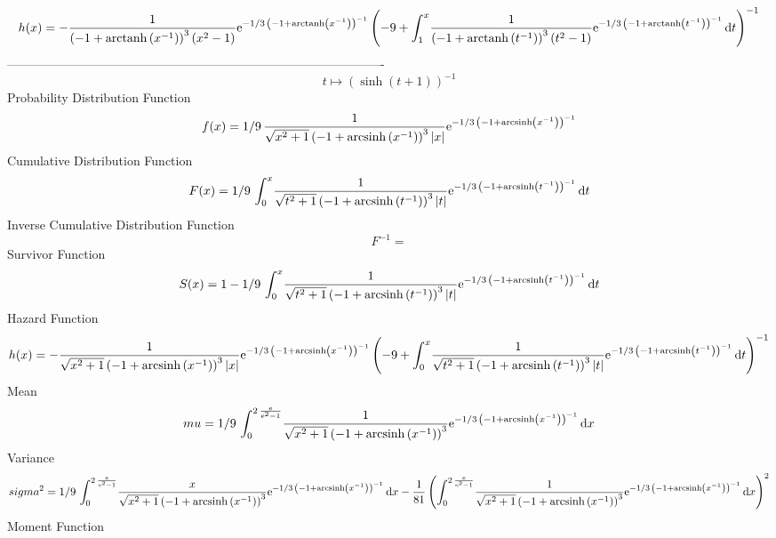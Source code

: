 \documentclass[12pt]{article}
\begin{document}
 $$ h(x)=-{\frac {1}{ \left( -1+{\rm arctanh} \left({x}^{-1}\right) \right) ^{3
} \left( {x}^{2}-1 \right) }{{\rm e}^{-1/3\, \left( -1+{\rm arctanh} 
\left({x}^{-1}\right) \right) ^{-1}}} \left( -9+\int_{1}^{x}\!{\frac {
1}{ \left( -1+{\rm arctanh} \left({t}^{-1}\right) \right) ^{3} \left( 
{t}^{2}-1 \right) }{{\rm e}^{-1/3\, \left( -1+{\rm arctanh} \left({t}^
{-1}\right) \right) ^{-1}}}}\,{\rm d}t \right) ^{-1}}
$$-------------------------------------------------------------------------------------------  \\$$t\mapsto  \left( \sinh \left( t+1 \right)  \right) ^{-1}
$$Probability Distribution Function 
$$  f(x)=1/9\,{\frac {1}{\sqrt {{x}^{2}+1} \left( -1+{\rm arcsinh} \left({x}^{-
1}\right) \right) ^{3} \left| x \right| }{{\rm e}^{-1/3\, \left( -1+
{\rm arcsinh} \left({x}^{-1}\right) \right) ^{-1}}}}
$$Cumulative Distribution Function  
 $$F(x)=1/9\,\int_{0}^{x}\!{\frac {1}{\sqrt {{t}^{2}+1} \left( -1+
{\rm arcsinh} \left({t}^{-1}\right) \right) ^{3} \left| t \right| }{
{\rm e}^{-1/3\, \left( -1+{\rm arcsinh} \left({t}^{-1}\right) \right) 
^{-1}}}}\,{\rm d}t
$$ Inverse Cumulative Distribution Function 
  $$F^{-1} = $$Survivor Function 
 $$ S(x)=1-1/9\,\int_{0}^{x}\!{\frac {1}{\sqrt {{t}^{2}+1} \left( -1+
{\rm arcsinh} \left({t}^{-1}\right) \right) ^{3} \left| t \right| }{
{\rm e}^{-1/3\, \left( -1+{\rm arcsinh} \left({t}^{-1}\right) \right) 
^{-1}}}}\,{\rm d}t
$$ Hazard Function 
 $$ h(x)=-{\frac {1}{\sqrt {{x}^{2}+1} \left( -1+{\rm arcsinh} \left({x}^{-1}
\right) \right) ^{3} \left| x \right| }{{\rm e}^{-1/3\, \left( -1+
{\rm arcsinh} \left({x}^{-1}\right) \right) ^{-1}}} \left( -9+\int_{0}
^{x}\!{\frac {1}{\sqrt {{t}^{2}+1} \left( -1+{\rm arcsinh} \left({t}^{
-1}\right) \right) ^{3} \left| t \right| }{{\rm e}^{-1/3\, \left( -1+
{\rm arcsinh} \left({t}^{-1}\right) \right) ^{-1}}}}\,{\rm d}t
 \right) ^{-1}}
$$Mean 
 $$ mu=1/9\,\int_{0}^{2\,{\frac {{\rm e}}{{{\rm e}^{2}}-1}}}\!{\frac {1}{
\sqrt {{x}^{2}+1} \left( -1+{\rm arcsinh} \left({x}^{-1}\right)
 \right) ^{3}}{{\rm e}^{-1/3\, \left( -1+{\rm arcsinh} \left({x}^{-1}
\right) \right) ^{-1}}}}\,{\rm d}x
$$ Variance 
 $$ sigma^2 = 1/9\,\int_{0}^{2\,{\frac {{\rm e}}{{{\rm e}^{2}}-1}}}\!{\frac {x}{
\sqrt {{x}^{2}+1} \left( -1+{\rm arcsinh} \left({x}^{-1}\right)
 \right) ^{3}}{{\rm e}^{-1/3\, \left( -1+{\rm arcsinh} \left({x}^{-1}
\right) \right) ^{-1}}}}\,{\rm d}x-{\frac {1}{81} \left( \int_{0}^{2\,
{\frac {{\rm e}}{{{\rm e}^{2}}-1}}}\!{\frac {1}{\sqrt {{x}^{2}+1}
 \left( -1+{\rm arcsinh} \left({x}^{-1}\right) \right) ^{3}}{{\rm e}^{
-1/3\, \left( -1+{\rm arcsinh} \left({x}^{-1}\right) \right) ^{-1}}}}
\,{\rm d}x \right) ^{2}}
$$Moment Function 
\end{document}
